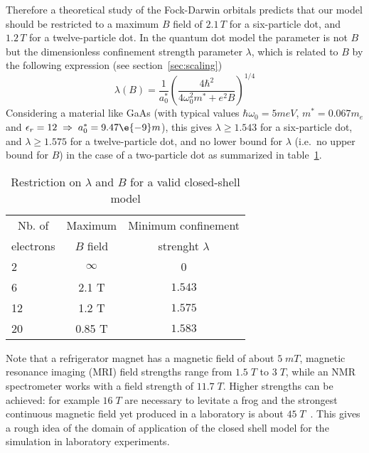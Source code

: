 Therefore a theoretical study of the Fock-Darwin orbitals predicts that our model should be restricted to a maximum $B$ field of $2.1\,T$ for a six-particle dot, and $1.2\,T$ for a twelve-particle dot. In the quantum dot model the parameter is not $B$ but the dimensionless confinement strength parameter $\lambda$, which is related to $B$ by the following expression (see section~\ref{sec:scaling})
\begin{equation}
\lambda (B)=\frac{1}{a_0^*} \left( \frac{4 \hbar^2 }{4 \omega_0^2 m^* + e^2 B} \right)^{1/4}
\end{equation} 
Considering a material like GaAs (with typical values $\hbar \omega_0 =5meV$, $m^*=0.067m_e$ and $\epsilon_r=12 \;\Rightarrow \; a_0^*=9.47 \e{-9}m$), this gives $\lambda \geq 1.543$ for a six-particle dot, and $\lambda \geq 1.575$ for a twelve-particle dot, and no lower bound for $\lambda$ (i.e.\ no upper bound for $B$) in the case of a two-particle dot as summarized in table~\ref{table:FockDarwin}.
\begin{table}[ht]
\centering      %
\begin{tabular}{l|c|c}  %
\toprule[1pt]  
\multicolumn{1}{c|}{Nb. of } &\multicolumn{1}{c|}{Maximum} &\multicolumn{1}{c}{Minimum confinement} \\
\multicolumn{1}{c|}{electrons} &\multicolumn{1}{c|}{$B$ field} &\multicolumn{1}{c}{strenght $\lambda$}\\ [0.7ex]  %
\hline                    %
2 & $\infty$ & 0 \\
6 & 2.1 T & $1.543$ \\
12 & 1.2 T & $1.575$ \\
20 & 0.85 T & $1.583$ \\
\hline   
\hline  
\end{tabular}
 \caption{Restriction on $\lambda$ and $B$ for a valid closed-shell model}
\label{table:FockDarwin} 
\end{table} 
Note that a refrigerator magnet has a magnetic field of about $5\;mT$, magnetic resonance imaging (MRI) field strengths range from $1.5 \; T$ to $3 \; T$, while an NMR spectrometer works with a field strength of $11.7\; T$. Higher strengths can be achieved: for example $16\;T$ are necessary to levitate a frog and the strongest continuous magnetic field yet produced in a laboratory is about $45\; T$~\cite{wiki:MagneticField}.
This gives a rough idea of the domain of application of the closed shell model for the simulation in laboratory experiments.

